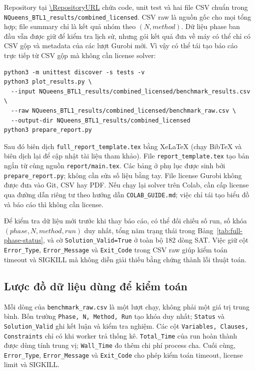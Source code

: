 Repository tại \url{\RepositoryURL} chứa code, unit test và hai file
CSV chuẩn trong \texttt{NQueens\_BTL1\_results/combined\_licensed}.
CSV raw là nguồn gốc cho mọi tổng hợp; file summary chỉ là kết quả
nhóm theo $(N,method)$. Dữ liệu phase ban đầu vẫn được giữ để kiểm
tra lịch sử, nhưng gói kết quả đưa về máy có thể chỉ có CSV gộp và
metadata của các lượt Gurobi mới. Vì vậy có thể tái tạo báo cáo trực
tiếp từ CSV gộp mà không cần license solver:

\begin{verbatim}
python3 -m unittest discover -s tests -v
python3 plot_results.py \
  --input NQueens_BTL1_results/combined_licensed/benchmark_results.csv \
  --raw NQueens_BTL1_results/combined_licensed/benchmark_raw.csv \
  --output-dir NQueens_BTL1_results/combined_licensed
python3 prepare_report.py
\end{verbatim}

Sau đó biên dịch \texttt{full\_report\_template.tex} bằng XeLaTeX
(chạy BibTeX và biên dịch lại để cập nhật tài liệu tham khảo). File
\texttt{report\_template.tex} tạo bản ngắn từ cùng nguồn
\texttt{report/main.tex}. Các bảng ở phụ lục được sinh bởi
\texttt{prepare\_report.py}; không cần sửa số liệu bằng tay. File
license Gurobi không được đưa vào Git, CSV hay PDF. Nếu chạy lại solver
trên Colab, cần cấp license qua đường dẫn riêng tư theo hướng dẫn
\texttt{COLAB\_GUIDE.md}; việc chỉ tái tạo biểu đồ và báo cáo thì
không cần license.

Để kiểm tra dữ liệu mới trước khi thay báo cáo, có thể đối chiếu số
run, số khóa $(phase,N,method,run)$ duy nhất, tổng năm trạng thái trong
Bảng~\ref{tab:full-phase-status}, và cờ
\texttt{Solution\_Valid=True} ở toàn bộ 182 dòng SAT. Việc giữ cột
\texttt{Error\_Type}, \texttt{Error\_Message} và
\texttt{Exit\_Code} trong CSV raw giúp kiểm toán timeout và SIGKILL
mà không diễn giải thiếu bằng chứng thành lỗi thuật toán.

\subsection*{Lược đồ dữ liệu dùng để kiểm toán}

Mỗi dòng của \texttt{benchmark\_raw.csv} là một lượt chạy, không phải
một giá trị trung bình. Bốn trường \texttt{Phase, N, Method, Run} tạo
khóa duy nhất; \texttt{Status} và \texttt{Solution\_Valid} ghi kết luận
và kiểm tra nghiệm. Các cột \texttt{Variables, Clauses, Constraints}
chỉ có khi worker trả thống kê. \texttt{Total\_Time} của run hoàn thành
được dùng tính trung vị; \texttt{Wall\_Time} đo thêm chi phí process cha.
Cuối cùng, \texttt{Error\_Type}, \texttt{Error\_Message} và
\texttt{Exit\_Code} cho phép kiểm toán timeout, license limit và SIGKILL.
